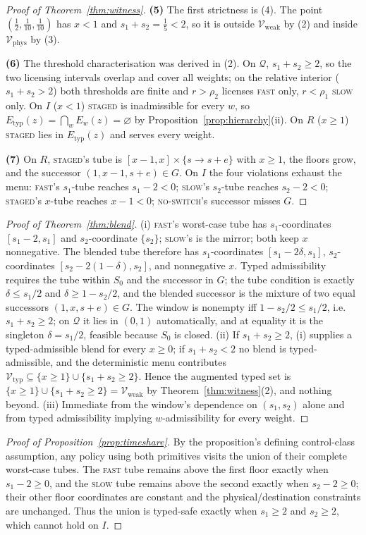 \documentclass[preprint,11pt,authoryear]{elsarticle}
\theoremstyle{definition}
\theoremstyle{remark}
\newcommand{\Etyp}{E_{\mathrm{typ}}}
\newcommand{\Vtyp}{\mathcal{V}_{\mathrm{typ}}}
\newcommand{\Vweak}{\mathcal{V}_{\mathrm{weak}}}
\newcommand{\Vphys}{\mathcal{V}_{\mathrm{phys}}}
\newcommand{\Q}{\mathcal{Q}}
\newcommand{\act}[1]{\textsc{#1}}
\begin{document}
\begin{proof}[Proof of Theorem~\ref{thm:witness}]
\textbf{(5)} The first strictness is (4). The point $(\tfrac12,\tfrac1{10},\tfrac1{10})$ has $x<1$ and $s_1+s_2=\tfrac15<2$, so it is outside $\Vweak$ by (2) and inside $\Vphys$ by (3).

\textbf{(6)} The threshold characterisation was derived in (2). On $\Q$, $s_1+s_2\ge2$, so the two licensing intervals overlap and cover all weights; on the relative interior ($s_1+s_2>2$) both thresholds are finite and $r>\rho_2$ licenses \act{fast} only, $r<\rho_1$ \act{slow} only. On $I$ ($x<1$) \act{staged} is inadmissible for every $w$, so $\Etyp(z)=\bigcap_wE_w(z)=\varnothing$ by Proposition~\ref{prop:hierarchy}(ii). On $R$ ($x\ge1$) \act{staged} lies in $\Etyp(z)$ and serves every weight.

\textbf{(7)} On $R$, \act{staged}'s tube is $[x-1,x]\times\{s\to s+e\}$ with $x\ge1$, the floors grow, and the successor $(1,x-1,s+e)\in G$. On $I$ the four violations exhaust the menu: \act{fast}'s $s_1$-tube reaches $s_1-2<0$; \act{slow}'s $s_2$-tube reaches $s_2-2<0$; \act{staged}'s $x$-tube reaches $x-1<0$; \act{no-switch}'s successor misses $G$.
\end{proof}

\begin{proof}[Proof of Theorem~\ref{thm:blend}]
(i) \act{fast}'s worst-case tube has $s_1$-coordinates $[s_1-2,s_1]$ and $s_2$-coordinate $\{s_2\}$; \act{slow}'s is the mirror; both keep $x$ nonnegative. The blended tube therefore has $s_1$-coordinates $[s_1-2\delta,s_1]$, $s_2$-coordinates $[s_2-2(1-\delta),s_2]$, and nonnegative $x$. Typed admissibility requires the tube within $S_0$ and the successor in $G$; the tube condition is exactly $\delta\le s_1/2$ and $\delta\ge1-s_2/2$, and the blended successor is the mixture of two equal successors $(1,x,s+e)\in G$. The window is nonempty iff $1-s_2/2\le s_1/2$, i.e.\ $s_1+s_2\ge2$; on $\Q$ it lies in $(0,1)$ automatically, and at equality it is the singleton $\delta=s_1/2$, feasible because $S_0$ is closed.
(ii) If $s_1+s_2\ge2$, (i) supplies a typed-admissible blend for every $x\ge0$; if $s_1+s_2<2$ no blend is typed-admissible, and the deterministic menu contributes $\Vtyp\subseteq\{x\ge1\}\cup\{s_1+s_2\ge2\}$. Hence the augmented typed set is $\{x\ge1\}\cup\{s_1+s_2\ge2\}=\Vweak$ by Theorem~\ref{thm:witness}(2), and nothing beyond.
(iii) Immediate from the window's dependence on $(s_1,s_2)$ alone and from typed admissibility implying $w$-admissibility for every weight.
\end{proof}

\begin{proof}[Proof of Proposition~\ref{prop:timeshare}]
By the proposition's defining control-class assumption, any policy using both primitives visits the union of their complete worst-case tubes. The \act{fast} tube remains above the first floor exactly when $s_1-2\ge0$, and the \act{slow} tube remains above the second exactly when $s_2-2\ge0$; their other floor coordinates are constant and the physical/destination constraints are unchanged. Thus the union is typed-safe exactly when $s_1\ge2$ and $s_2\ge2$, which cannot hold on $I$.
\end{proof}
\end{document}
